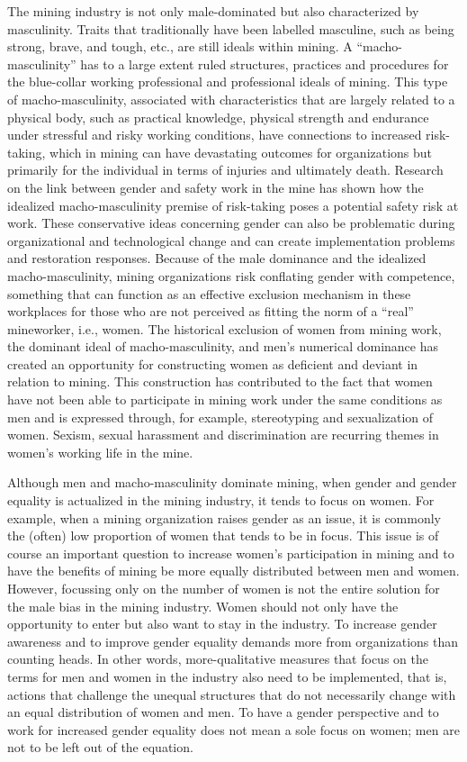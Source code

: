 \documentclass[
  12pt,
]{scrbook}
\begin{document}
The mining industry is not only male-dominated but also characterized by masculinity. Traits that traditionally have been labelled masculine, such as being strong, brave, and tough, etc., are still ideals within mining. A ``macho-masculinity'' has to a large extent ruled structures, practices and procedures for the blue-collar working professional and professional ideals of mining. This type of macho-masculinity, associated with characteristics that are largely related to a physical body, such as practical knowledge, physical strength and endurance under stressful and risky working conditions, have connections to increased risk-taking, which in mining can have devastating outcomes for organizations but primarily for the individual in terms of injuries and ultimately death. Research on the link between gender and safety work in the mine has shown how the idealized macho-masculinity premise of risk-taking poses a potential safety risk at work. These conservative ideas concerning gender can also be problematic during organizational and technological change and can create implementation problems and restoration responses. Because of the male dominance and the idealized macho-masculinity, mining organizations risk conflating gender with competence, something that can function as an effective exclusion mechanism in these workplaces for those who are not perceived as fitting the norm of a ``real'' mineworker, i.e., women. The historical exclusion of women from mining work, the dominant ideal of macho-masculinity, and men's numerical dominance has created an opportunity for constructing women as deficient and deviant in relation to mining. This construction has contributed to the fact that women have not been able to participate in mining work under the same conditions as men and is expressed through, for example, stereotyping and sexualization of women. Sexism, sexual harassment and discrimination are recurring themes in women's working life in the mine.

Although men and macho-masculinity dominate mining, when gender and gender equality is actualized in the mining industry, it tends to focus on women. For example, when a mining organization raises gender as an issue, it is commonly the (often) low proportion of women that tends to be in focus. This issue is of course an important question to increase women's participation in mining and to have the benefits of mining be more equally distributed between men and women. However, focussing only on the number of women is not the entire solution for the male bias in the mining industry. Women should not only have the opportunity to enter but also want to stay in the industry. To increase gender awareness and to improve gender equality demands more from organizations than counting heads. In other words, more-qualitative measures that focus on the terms for men and women in the industry also need to be implemented, that is, actions that challenge the unequal structures that do not necessarily change with an equal distribution of women and men. To have a gender perspective and to work for increased gender equality does not mean a sole focus on women; men are not to be left out of the equation.
\end{document}
